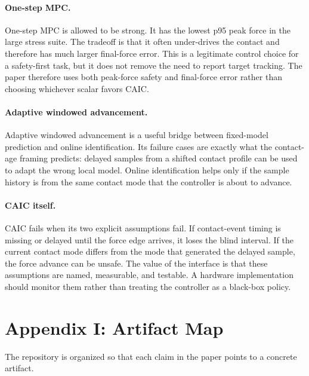 \documentclass{article}
\newcommand{\caic}{CAIC}
\begin{document}
\paragraph{One-step MPC.}
One-step MPC is allowed to be strong. It has the lowest p95 peak force in the large stress suite. The tradeoff is that it often under-drives the contact and therefore has much larger final-force error. This is a legitimate control choice for a safety-first task, but it does not remove the need to report target tracking. The paper therefore uses both peak-force safety and final-force error rather than choosing whichever scalar favors \caic{}.

\paragraph{Adaptive windowed advancement.}
Adaptive windowed advancement is a useful bridge between fixed-model prediction and online identification. Its failure cases are exactly what the contact-age framing predicts: delayed samples from a shifted contact profile can be used to adapt the wrong local model. Online identification helps only if the sample history is from the same contact mode that the controller is about to advance.

\paragraph{\caic{} itself.}
\caic{} fails when its two explicit assumptions fail. If contact-event timing is missing or delayed until the force edge arrives, it loses the blind interval. If the current contact mode differs from the mode that generated the delayed sample, the force advance can be unsafe. The value of the interface is that these assumptions are named, measurable, and testable. A hardware implementation should monitor them rather than treating the controller as a black-box policy.

\section{Appendix I: Artifact Map}

The repository is organized so that each claim in the paper points to a concrete artifact.
\end{document}

